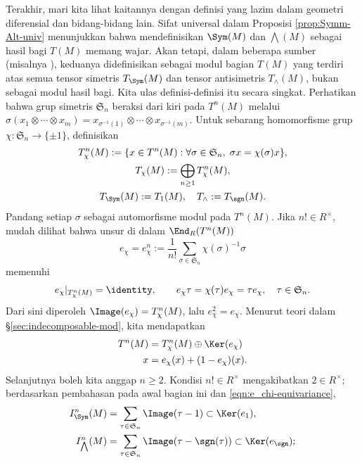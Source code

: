 Terakhir, mari kita lihat kaitannya dengan definisi yang lazim dalam geometri diferensial dan bidang-bidang lain. Sifat universal dalam Proposisi \ref{prop:Symm-Alt-univ} menunjukkan bahwa mendefinisikan $\Sym(M)$ dan $\bigwedge(M)$ sebagai hasil bagi $T(M)$ memang wajar. Akan tetapi, dalam beberapa sumber (misalnya \cite[\S 2.2]{ChCh}), keduanya didefinisikan sebagai modul bagian $T(M)$ yang terdiri atas semua tensor simetris $T_{\Sym}(M)$ dan tensor antisimetris $T_\wedge(M)$, bukan sebagai modul hasil bagi. Kita ulas definisi-definisi itu secara singkat. Perhatikan bahwa grup simetris $\mathfrak{S}_n$ beraksi dari kiri pada $T^n(M)$ melalui $\sigma(x_1 \otimes \cdots \otimes x_m) = x_{\sigma^{-1}(1)} \otimes \cdots \otimes x_{\sigma^{-1}(m)}$. Untuk sebarang homomorfisme grup $\chi: \mathfrak{S}_n \to \{\pm 1\}$, definisikan
\begin{gather*}
	T^n_\chi(M) := \{x \in T^n(M): \forall \sigma \in \mathfrak{S}_n,\; \sigma x = \chi(\sigma)x\}, \\
	T_\chi(M) := \bigoplus_{n \geq 1} T^n_\chi(M), \\
	T_{\Sym}(M) := T_1(M), \quad T_\wedge := T_{\sgn}(M).
\end{gather*}
Pandang setiap $\sigma$ sebagai automorfisme modul pada $T^n(M)$. Jika $n! \in R^\times$, mudah dilihat bahwa unsur di dalam $\End_R(T^n(M))$
\[ e_\chi = e^n_\chi := \frac{1}{n!} \sum_{\sigma \in \mathfrak{S}_n} \chi(\sigma)^{-1} \sigma \]
memenuhi
\begin{gather}\label{eqn:e_chi-equivariance}
	e_\chi|_{T^n_\chi(M)} = \identity, \qquad e_\chi \tau = \chi(\tau) e_\chi = \tau e_\chi, \quad \tau \in \mathfrak{S}_n.
\end{gather}
Dari sini diperoleh $\Image(e_\chi) = T^n_\chi(M)$, lalu $e_\chi^2 = e_\chi$. Menurut teori dalam \S\ref{sec:indecomposable-mod}, kita mendapatkan
\begin{align*}
	T^n(M) & = T^n_\chi(M) \oplus \Ker(e_\chi) \\
	x & = e_\chi(x) + (1 - e_\chi)(x).
\end{align*}
Selanjutnya boleh kita anggap $n \geq 2$. Kondisi $n! \in R^\times$ mengakibatkan $2 \in R^\times$; berdasarkan pembahasan pada awal bagian ini dan \eqref{eqn:e_chi-equivariance},
\begin{align*}
	I^n_{\Sym}(M) & = \sum_{\tau \in \mathfrak{S}_n} \Image(\tau - 1) \subset \Ker(e_1), \\
	I^n_{\bigwedge}(M) & = \sum_{\tau \in \mathfrak{S}_n} \Image(\tau - \sgn(\tau)) \subset \Ker(e_{\sgn});
\end{align*}
